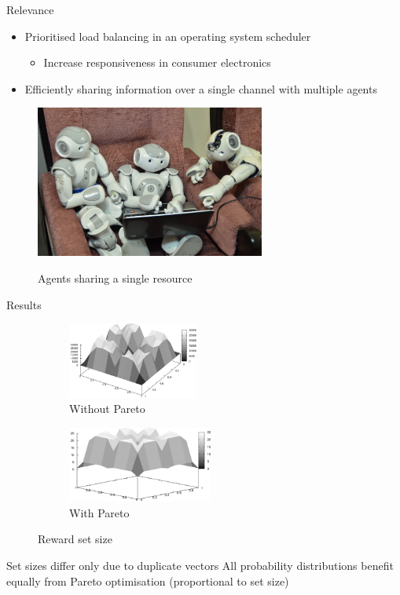 \documentclass{beamer}
\begin{document}
\begin{frame}{Relevance}
	\begin{itemize}
		\item Prioritised load balancing in an operating system scheduler
		\begin{itemize}
			\item Increase responsiveness in consumer electronics
		\end{itemize}
		\item Efficiently sharing information over a single channel with multiple
			agents
	\end{itemize}
	\begin{figure}
		\caption{Agents sharing a single resource}
		\includegraphics[height=5cm]{naos_pc}
	   \label{fig:naos_pc}
	\end{figure}
\end{frame}


\begin{frame}{Results}
	\begin{figure}
		\centering
		\begin{subfigure}[b]{0.3\textwidth}
			\centering
			\includegraphics[height=2.5cm]{../../images/r3_nopareto}
			\caption{Without Pareto}
			\label{fig:../../images/r3_nopareto}
		\end{subfigure}
		\hspace{2cm}
		\begin{subfigure}[b]{0.3\textwidth}
			\centering
			\includegraphics[height=2.5cm]{../../images/r3_diagonal}
			\caption{With Pareto}
			\label{fig:r3_diagonal}
		\end{subfigure}
		\caption{Reward set size}
	\end{figure}
	Set sizes differ only due to duplicate vectors All probability distributions
	benefit equally from Pareto optimisation (proportional to set size)
\end{frame}
\end{document}
